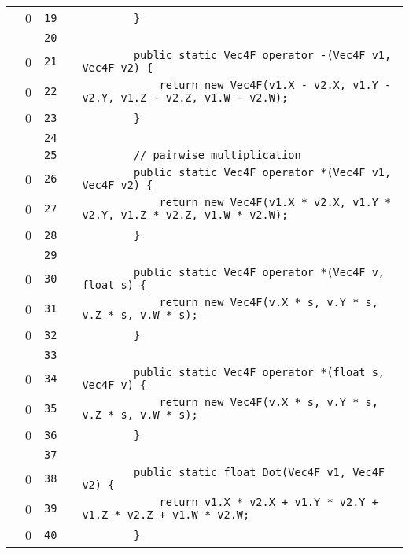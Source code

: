 \documentclass[a4paper,landscape,10pt]{article}
\begin{document}
\begin{longtable}[l]{lrrll}
\cellcolor{red} & 0 & \verb~19~ & & \verb~        }~\\
\cellcolor{gray} &  & \verb~20~ & & \verb~~\\
\cellcolor{red} & 0 & \verb~21~ & & \verb~        public static Vec4F operator -(Vec4F v1, Vec4F v2) {~\\
\cellcolor{red} & 0 & \verb~22~ & & \verb~            return new Vec4F(v1.X - v2.X, v1.Y - v2.Y, v1.Z - v2.Z, v1.W - v2.W);~\\
\cellcolor{red} & 0 & \verb~23~ & & \verb~        }~\\
\cellcolor{gray} &  & \verb~24~ & & \verb~~\\
\cellcolor{gray} &  & \verb~25~ & & \verb~        // pairwise multiplication~\\
\cellcolor{red} & 0 & \verb~26~ & & \verb~        public static Vec4F operator *(Vec4F v1, Vec4F v2) {~\\
\cellcolor{red} & 0 & \verb~27~ & & \verb~            return new Vec4F(v1.X * v2.X, v1.Y * v2.Y, v1.Z * v2.Z, v1.W * v2.W);~\\
\cellcolor{red} & 0 & \verb~28~ & & \verb~        }~\\
\cellcolor{gray} &  & \verb~29~ & & \verb~~\\
\cellcolor{red} & 0 & \verb~30~ & & \verb~        public static Vec4F operator *(Vec4F v, float s) {~\\
\cellcolor{red} & 0 & \verb~31~ & & \verb~            return new Vec4F(v.X * s, v.Y * s, v.Z * s, v.W * s);~\\
\cellcolor{red} & 0 & \verb~32~ & & \verb~        }~\\
\cellcolor{gray} &  & \verb~33~ & & \verb~~\\
\cellcolor{red} & 0 & \verb~34~ & & \verb~        public static Vec4F operator *(float s, Vec4F v) {~\\
\cellcolor{red} & 0 & \verb~35~ & & \verb~            return new Vec4F(v.X * s, v.Y * s, v.Z * s, v.W * s);~\\
\cellcolor{red} & 0 & \verb~36~ & & \verb~        }~\\
\cellcolor{gray} &  & \verb~37~ & & \verb~~\\
\cellcolor{red} & 0 & \verb~38~ & & \verb~        public static float Dot(Vec4F v1, Vec4F v2) {~\\
\cellcolor{red} & 0 & \verb~39~ & & \verb~            return v1.X * v2.X + v1.Y * v2.Y + v1.Z * v2.Z + v1.W * v2.W;~\\
\cellcolor{red} & 0 & \verb~40~ & & \verb~        }~\\

\end{longtable}
\end{document}
